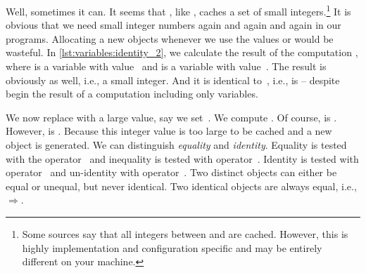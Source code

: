 Well, sometimes it can.
It seems that \python, like , caches a set of small integers.\footnote{%
Some sources say that all integers between  and  are cached. %
However, this is highly implementation and configuration specific and may be entirely different on your machine.%
}
It is obvious that we need small integer numbers again and again and again in our programs.
Allocating a new objects whenever we use the values  or  would be wasteful.
In \cref{lst:variables:identity_2}, we calculate the result of the computation , where  is a variable with value~ and  is a variable with value~.
The result is obviously  as well, i.e., a small integer.
And it is identical to~, i.e.,  is  -- despite begin the result of a computation including only variables.

We now replace  with a large value, say we set~.
We compute .
Of course,  is .
However,  is .
Because this integer value is too large to be cached and a new object is generated.%
%
%
We can distinguish \emph{equality} and \emph{identity}.
Equality is tested with the operator~\pythonilIdx{==} and inequality is tested with operator~.
Identity is tested with operator~ and un-identity with operator~.
Two distinct objects can either be equal or unequal, but never identical.
Two identical objects are always equal, i.e., $\Rightarrow$.%
\endhsection%
\FloatBarrier%
\endhsection%
%
